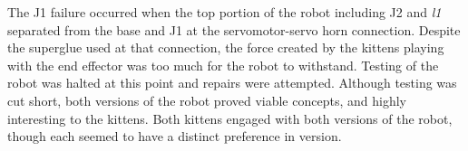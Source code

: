The J1 failure occurred when the top portion of the robot including J2 and \textit{l1} separated from the base and J1 at the servomotor-servo horn connection. Despite the superglue used at that connection, the force created by the kittens playing with the end effector was too much for the robot to withstand. Testing of the robot was halted at this point and repairs were attempted. 
Although testing was cut short, both versions of the robot proved viable concepts, and highly interesting to the kittens. Both kittens engaged with both versions of the robot, though each seemed to have a distinct preference in version.
